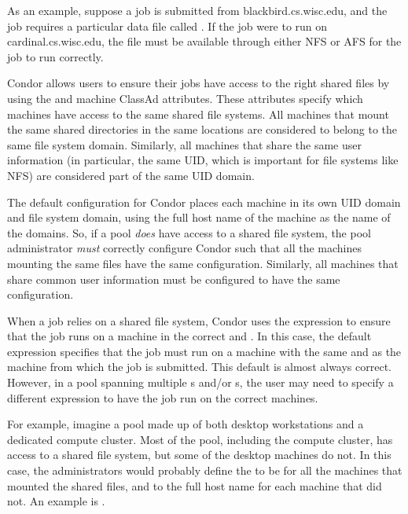 As an example, suppose a job is submitted from blackbird.cs.wisc.edu,
and the job requires a particular data file called
.  If the job were to run on
cardinal.cs.wisc.edu, the file  must be
available through either NFS or AFS for the job to run correctly.

Condor allows users to ensure their jobs have access to the right
shared files by using the  and
 machine ClassAd attributes.
These attributes specify which machines have access to the same shared
file systems.
All machines that mount the same shared directories in the same
locations are considered to belong to the same file system domain.
Similarly, all machines that share the same user information (in
particular, the same UID, which is important for file systems like
NFS) are considered part of the same UID domain.

The default configuration for Condor places each machine
in its own UID domain and file system domain, using the full host name of the
machine as the name of the domains.
So, if a pool \emph{does} have access to a shared file system,
the pool administrator \emph{must} correctly configure Condor 
such that all
the machines mounting the same files have the same
 configuration.
Similarly, all machines that share common user information must be
configured to have the same  configuration.

When a job relies on a shared file system,
Condor uses the
 expression to ensure that the job runs
on a machine in the
correct  and .
In this case, the default  expression specifies
that the job must run on a machine with the same 
and  as the machine from which the job
is submitted.
This default is almost always correct.
However, in a pool spanning multiple s and/or
s, the user may need to specify a different
 expression to have the job run on the correct
machines.

For example, imagine a pool made up of both desktop workstations and a
dedicated compute cluster.
Most of the pool, including the compute cluster, has access to a
shared file system, but some of the desktop machines do not.
In this case, the administrators would probably define the
 to be  for all the machines
that mounted the shared files, and to the full host name for each
machine that did not. An example is .

